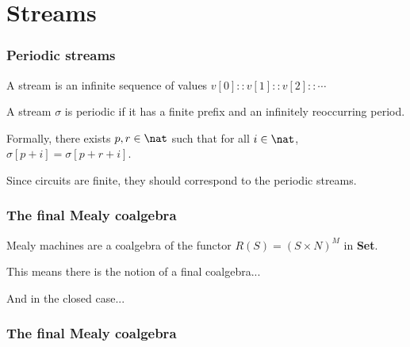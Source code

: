 \section{Streams}

\begin{frame}
    \frametitle{Periodic streams}

    A stream is an \alert{infinite sequence} of values $v[0] :: v[1] :: v[2] :: \cdots$

    \pause

    A stream $\sigma$ is \alert{periodic} if it has a finite \alert{prefix} and an infinitely reoccurring \alert{period}.
    
    \pause

    Formally, there exists $p,r \in \nat$ such that for all $i \in \nat$, $\sigma[p+i] = \sigma[p+r+i]$.
    
    \pause

    Since circuits are \alert{finite}, they should correspond to the \alert{periodic streams}.

\end{frame}

\begin{frame}
    \frametitle{The final Mealy coalgebra}

    Mealy machines are a \alert{coalgebra} of the functor $R(S) = (S \times N)^M$ in \textbf{Set}.

    \pause

    This means there is the notion of a \alert{final coalgebra}...

    \pause

    \begin{center}
        
    \end{center}

    \pause

    And in the closed case...

    \pause

    \begin{center}
        
    \end{center}

\end{frame}

\begin{frame}
    \frametitle{The final Mealy coalgebra}
    

\end{frame}